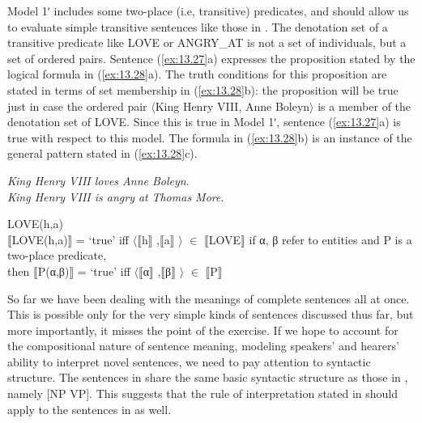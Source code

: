 Model 1ʹ includes some two-place (i.e, transitive) predicates, and should allow us to evaluate simple transitive sentences like those in . The denotation set of a transitive predicate like LOVE or ANGRY\_AT is not a set of individuals, but a set of ordered pairs. Sentence (\ref{ex:13.27}a) expresses the proposition stated by the logical formula in (\ref{ex:13.28}a). The truth conditions for this proposition are stated in terms of set membership in (\ref{ex:13.28}b): the proposition will be true just in case the ordered pair $\langle$King Henry VIII, Anne Boleyn$\rangle$ is a member of the denotation set of LOVE. Since this is true in Model 1ʹ, sentence (\ref{ex:13.27}a) is true with respect to this model. The formula in (\ref{ex:13.28}b) is an instance of the general pattern stated in (\ref{ex:13.28}c).


\ea \label{ex:13.27}
\ea \textit{King Henry VIII loves Anne Boleyn}.\\
\ex \textit{King Henry VIII is angry at} \textit{Thomas More}.
                       \z
\z

\ea \label{ex:13.28}
\ea  LOVE(h,a)\\
\ex  $\llbracket$LOVE(h,a)$\rrbracket$  = ‘true’  iff  $\langle$$\llbracket$h$\rrbracket$ ,$\llbracket$a$\rrbracket$ $\rangle$ ${\in}$ $\llbracket$LOVE$\rrbracket$ 
\ex  if α, β refer to entities and P is a two-place predicate,\\
  then  $\llbracket$P(α,β)$\rrbracket$  = ‘true’  iff  $\langle$$\llbracket$α$\rrbracket$ ,$\llbracket$β$\rrbracket$ $\rangle$ ${\in}$ $\llbracket$P$\rrbracket$ 
\z \z


So far we have been dealing with the meanings of complete sentences all at once. This is possible only for the very simple kinds of sentences discussed thus far, but more importantly, it misses the point of the exercise. If we hope to account for the compositional nature of sentence meaning, modeling speakers’ and hearers’ ability to interpret novel sentences, we need to pay attention to syntactic structure. The sentences in  share the same basic syntactic structure as those in , namely [NP VP]. This suggests that the rule of interpretation stated in  should apply to the sentences in  as well.



